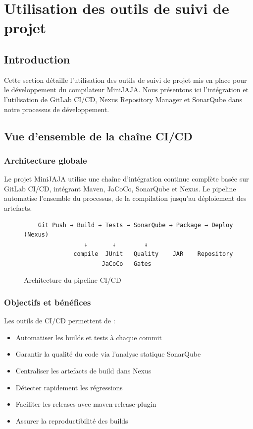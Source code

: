 \section{Utilisation des outils de suivi de projet}

\subsection{Introduction}
Cette section détaille l'utilisation des outils de suivi de projet mis en place pour le développement du compilateur MiniJAJA. Nous présentons ici l'intégration et l'utilisation de GitLab CI/CD, Nexus Repository Manager et SonarQube dans notre processus de développement.

\subsection{Vue d'ensemble de la chaîne CI/CD}

\subsubsection{Architecture globale}

Le projet MiniJAJA utilise une chaîne d'intégration continue complète basée sur GitLab CI/CD, intégrant Maven, JaCoCo, SonarQube et Nexus. Le pipeline automatise l'ensemble du processus, de la compilation jusqu'au déploiement des artefacts.

\begin{figure}[h]
    \centering
    \begin{verbatim}
    Git Push → Build → Tests → SonarQube → Package → Deploy (Nexus)
                 ↓       ↓        ↓
              compile  JUnit   Quality    JAR    Repository
                      JaCoCo   Gates
    \end{verbatim}
    \caption{Architecture du pipeline CI/CD}
\end{figure}

\subsubsection{Objectifs et bénéfices}

Les outils de CI/CD permettent de :
\begin{itemize}
    \item Automatiser les builds et tests à chaque commit
    \item Garantir la qualité du code via l'analyse statique SonarQube
    \item Centraliser les artefacts de build dans Nexus
    \item Détecter rapidement les régressions
    \item Faciliter les releases avec maven-release-plugin
    \item Assurer la reproductibilité des builds
\end{itemize}

